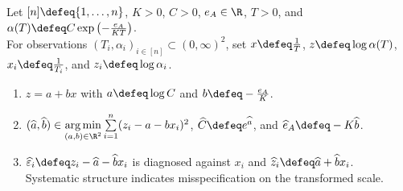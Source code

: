 \begin{method} \label{meth:linearizing-transformations-for-regression} \\
Let $[n]\defeq\{1,\ldots,n\}$, $K>0$, $C>0$, $e_A\in\R$, $T>0$, and $\alpha(T)\defeq C\exp\left(-\frac{e_A}{KT}\right)$.\\
For observations $(T_i,\alpha_i)_{i\in[n]}\subset(0,\infty)^2$, set $x\defeq\frac{1}{T}$, $z\defeq\log\alpha(T)$, $x_i\defeq\frac{1}{T_i}$, and $z_i\defeq\log\alpha_i$.
\begin{enumerate}[label=(\roman*)]
\setlength{\itemsep}{0pt}
\item $z=a+bx$ with $a\defeq\log C$ and $b\defeq-\frac{e_A}{K}$.
\item $(\widehat{a},\widehat{b})\in\operatorname*{arg\,min}\limits_{(a,b)\in\R^2}\sum\limits_{i=1}^{n}(z_i-a-bx_i)^2$, $\widehat{C}\defeq e^{\widehat{a}}$, and $\widehat{e}_A\defeq-K\widehat{b}$.
\item $\widehat{\varepsilon}_i\defeq z_i-\widehat{a}-\widehat{b}x_i$ is diagnosed against $x_i$ and $\widehat{z}_i\defeq\widehat{a}+\widehat{b}x_i$.\\
Systematic structure indicates misspecification on the transformed scale.
\end{enumerate}
\end{method}
